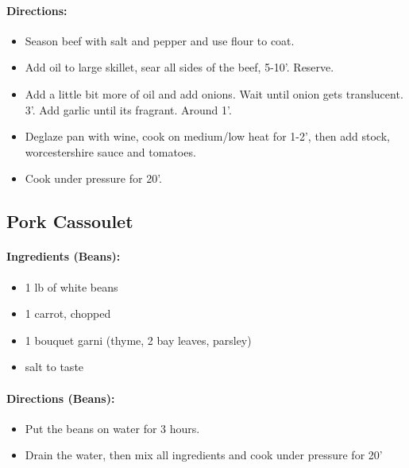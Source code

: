 \documentclass{article}
\begin{document}
\paragraph{Directions:}
\begin{itemize}
  \item Season beef with salt and pepper and use flour to coat.
  \item Add oil to large skillet, sear all sides of the beef, 5-10’. Reserve.
  \item Add a little bit more of oil and add onions. Wait until onion gets translucent. 3’. Add garlic until its fragrant. Around 1’.
  \item Deglaze pan with wine, cook on medium/low heat for 1-2’, then add stock, worcestershire sauce and tomatoes.
  \item Cook under pressure for 20’.
\end{itemize}

\subsection{Pork Cassoulet}

\paragraph{Ingredients (Beans):}
\begin{itemize}
	\item 1 lb of white beans
	\item 1 carrot, chopped
	\item 1 bouquet garni (thyme, 2 bay leaves, parsley)
	\item salt to taste
\end{itemize}

\paragraph{Directions (Beans):}
\begin{itemize}
	\item Put the beans on water for 3 hours.
	\item Drain the water, then mix all ingredients and cook under pressure for 20'
\end{itemize}
\end{document}
